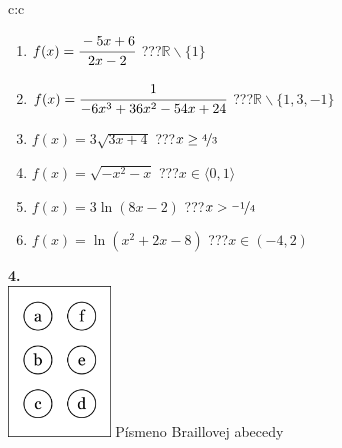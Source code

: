 \documentclass[10pt]{report}
\begin{document}
\begin{tabular}{c:c}
\begin{minipage}[c][104.5mm][t]{0.5\linewidth}
\begin{center}
\begin{minipage}{0.79\linewidth}
\begin{center}
\begin{varwidth}{\linewidth}
\begin{enumerate}
\normalsizerrr
\item $f(x)=\cfrac{-5x+6}{2x-2}$\quad \dotfill\; ???\;\dotfill \quad $\mathbb{R}\smallsetminus\{1\}$
\item $f(x)=\cfrac{1}{-6x^3+36x^2-54x+24}$\quad \dotfill\; ???\;\dotfill \quad $\mathbb{R}\smallsetminus\{1,3,-1\}$
\item $f(x)=3\sqrt{3x+4}$\quad \dotfill\; ???\;\dotfill \quad $x\geq\nicefrac{4}{3}$
\item $f(x)=\sqrt{-x^2-x}$\quad \dotfill\; ???\;\dotfill \quad $x\in\langle0 , 1\rangle$
\item $f(x)=3\ln{(8x-2)}$\quad \dotfill\; ???\;\dotfill \quad $x>\nicefrac{-1}{4}$
\item $f(x)=\ln{(x^2+2x-8)}$\quad \dotfill\; ???\;\dotfill \quad $x\in(-4 , 2)$
\end{enumerate}
\end{varwidth}
\end{center}
\end{minipage}
\begin{minipage}{0.20\linewidth}
\begin{center}
{\Huge\bfseries 4.} \\[2mm]
\includegraphics[height=40mm]{../images/braille.png}
{\small Písmeno Braillovej abecedy}
\end{center}
\end{minipage}
\end{center}
\end{minipage}
%
\end{tabular}
\newpage
\thispagestyle{empty}
\end{document}
